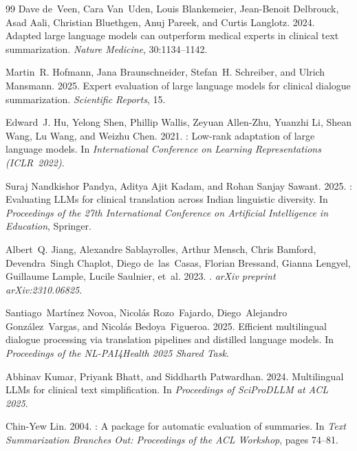 \documentclass[10pt,twocolumn]{article}
\begin{document}
\begin{thebibliography}{99}
Dave de~Veen, Cara Van~Uden, Louis Blankemeier, Jean-Benoit Delbrouck,
  Asad Aali, Christian Bluethgen, Anuj Pareek, and Curtis Langlotz. 2024.
\newblock Adapted large language models can outperform medical experts in
  clinical text summarization.
\newblock \textit{Nature Medicine}, 30:1134--1142.

Martin~R. Hofmann, Jana Braunschneider, Stefan~H. Schreiber, and Ulrich
  Mansmann. 2025.
\newblock Expert evaluation of large language models for clinical dialogue
  summarization.
\newblock \textit{Scientific Reports}, 15.

Edward~J. Hu, Yelong Shen, Phillip Wallis, Zeyuan Allen-Zhu, Yuanzhi Li,
  Shean Wang, Lu Wang, and Weizhu Chen. 2021.
: Low-rank adaptation of large language models.
\newblock In \textit{International Conference on Learning Representations
  (ICLR~2022)}.

Suraj Nandkishor Pandya, Aditya Ajit Kadam, and Rohan Sanjay Sawant. 2025.
: Evaluating {LLMs} for clinical translation across
  {Indian} linguistic diversity.
\newblock In \textit{Proceedings of the 27th International Conference on
  Artificial Intelligence in Education}, Springer.

Albert~Q. Jiang, Alexandre Sablayrolles, Arthur Mensch, Chris Bamford,
  Devendra~Singh Chaplot, Diego de~las~Casas, Florian Bressand, Gianna
  Lengyel, Guillaume Lample, Lucile Saulnier, et~al. 2023.
.
\newblock \textit{arXiv preprint arXiv:2310.06825}.

Santiago~Mart{\'i}nez Novoa, Nicol{\'a}s Rozo~Fajardo, Diego~Alejandro
  Gonz{\'a}lez~Vargas, and Nicol{\'a}s Bedoya~Figueroa. 2025.
\newblock Efficient multilingual dialogue processing via translation pipelines
  and distilled language models.
\newblock In \textit{Proceedings of the NL-PAI4Health 2025 Shared Task}.

Abhinav Kumar, Priyank Bhatt, and Siddharth Patwardhan. 2024.
\newblock Multilingual {LLMs} for clinical text simplification.
\newblock In \textit{Proceedings of SciProDLLM at ACL 2025}.

Chin-Yew Lin. 2004.
: A package for automatic evaluation of summaries.
\newblock In \textit{Text Summarization Branches Out: Proceedings of the ACL
  Workshop}, pages 74--81.


\end{thebibliography}
\end{document}

